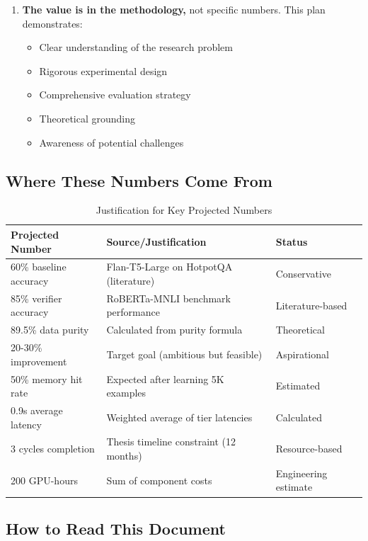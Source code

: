 \documentclass[12pt,a4paper]{article}
\theoremstyle{definition}
\begin{document}
\begin{tcolorbox}[
    colback=yellow!10!white,
    colframe=orange!75!black,
    title={\Large\textbf{IMPORTANT: About the Numbers in This Document}},
    breakable,
    enhanced,
    fontupper=\normalsize
]
\begin{enumerate}
    \item \textbf{The value is in the methodology,} not specific numbers. This plan demonstrates:
    \begin{itemize}
        \item Clear understanding of the research problem
        \item Rigorous experimental design
        \item Comprehensive evaluation strategy
        \item Theoretical grounding
        \item Awareness of potential challenges
    \end{itemize}
\end{enumerate}

\subsection*{Where These Numbers Come From}

\begin{table}[h]
\centering
\caption{Justification for Key Projected Numbers}
\small
\begin{tabular}{lll}
\toprule
\textbf{Projected Number} & \textbf{Source/Justification} & \textbf{Status} \\
\midrule
60\% baseline accuracy & Flan-T5-Large on HotpotQA (literature) & Conservative \\
85\% verifier accuracy & RoBERTa-MNLI benchmark performance & Literature-based \\
89.5\% data purity & Calculated from purity formula & Theoretical \\
20-30\% improvement & Target goal (ambitious but feasible) & Aspirational \\
50\% memory hit rate & Expected after learning 5K examples & Estimated \\
0.9s average latency & Weighted average of tier latencies & Calculated \\
3 cycles completion & Thesis timeline constraint (12 months) & Resource-based \\
200 GPU-hours & Sum of component costs & Engineering estimate \\
\bottomrule
\end{tabular}
\end{table}

\subsection*{How to Read This Document}


\end{tcolorbox}
\end{document}
